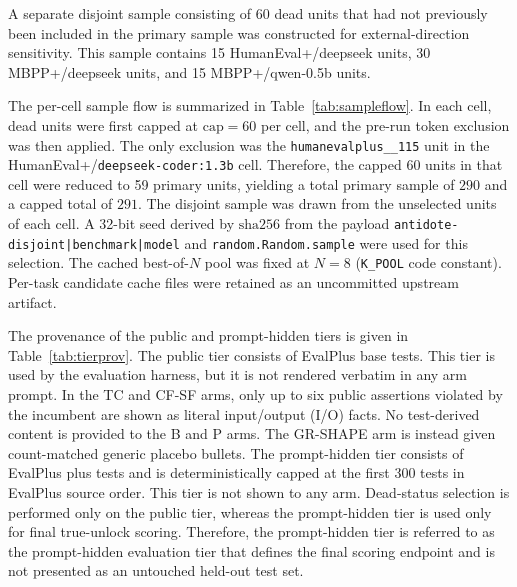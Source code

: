 \documentclass{article}
\numberwithin{equation}{section}  %
\newcommand{\fitwidth}[1]{\resizebox{\ifdim\width>\linewidth \linewidth\else\width\fi}{!}{#1}}
\theoremstyle{definition}
\newcommand{\armP}{\textsf{P}}
\newcommand{\armB}{\textsf{B}}
\newcommand{\armTC}{\textsf{TC}}
\newcommand{\armCF}{\textsf{CF-SF}}
\newcommand{\armGR}{\textsf{GR-SHAPE}}
\begin{document}
A separate disjoint sample consisting of 60 dead units that had not previously been included
in the primary sample was constructed for external-direction sensitivity. This sample contains
15 HumanEval+/deepseek units, 30 MBPP+/deepseek units, and 15 MBPP+/qwen-0.5b units.

The per-cell sample flow is summarized in Table~\ref{tab:sampleflow}. In each cell, dead units
were first capped at $\mathrm{cap}=60$ per cell, and the pre-run token exclusion was then
applied. The only exclusion was the \texttt{humanevalplus\_\_115} unit in the
HumanEval+/\texttt{deepseek-coder:1.3b} cell. Therefore, the capped 60 units in that cell were
reduced to 59 primary units, yielding a total primary sample of $290$ and a capped total of
$291$. The disjoint sample was drawn from the unselected units of each cell. A 32-bit seed
derived by $\mathrm{sha256}$ from the payload
\texttt{antidote-disjoint|benchmark|model} and \texttt{random.Random.sample} were used for
this selection. The cached best-of-$N$ pool was fixed at $N=8$ (\texttt{K\_POOL} code
constant). Per-task candidate cache files were retained as an uncommitted upstream artifact.

The provenance of the public and prompt-hidden tiers is given in Table~\ref{tab:tierprov}.
The public tier consists of EvalPlus base tests. This tier is used by the evaluation harness,
but it is not rendered verbatim in any arm prompt. In the \armTC{} and \armCF{} arms, only up
to six public assertions violated by the incumbent are shown as literal input/output (I/O)
facts. No test-derived content is provided to the \armB{} and \armP{} arms. The \armGR{} arm
is instead given count-matched generic placebo bullets. The prompt-hidden tier consists of
EvalPlus plus tests and is deterministically capped at the first 300 tests in EvalPlus source
order. This tier is not shown to any arm. Dead-status selection is performed only on the
public tier, whereas the prompt-hidden tier is used only for final true-unlock scoring.
Therefore, the prompt-hidden tier is referred to as the prompt-hidden evaluation tier that
defines the final scoring endpoint and is not presented as an untouched held-out test set.

\begin{table}[t]
\centering\footnotesize\setlength{\tabcolsep}{4pt}
\caption{Per benchmark$\times$model cell sample flow. Dead units were first capped at
$\mathrm{cap}=60$ per cell, and pre-run token exclusion was then applied.
Primary $=$ capped $-$ exclusions. The capped total is $291$, and the single exclusion
(\texttt{humanevalplus\_\_115}) reduces the primary sample to $290$. Initial counts were
computed from the deterministic EvalPlus loader (MBPP+ $378$ nominal minus $13$ loader
exclusions $=365$, HumanEval+ $164$). All counts were recomputed from committed ANTIDOTE
prerun manifests with \texttt{scripts/reconstruct\_sample\_selection.py} and reproduced
under the seeded selection rule.}
\label{tab:sampleflow}
\fitwidth{}
\end{table}
\end{document}
